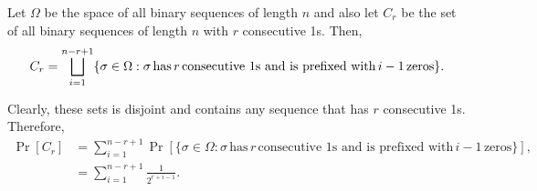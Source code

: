 \begin{solution}
    Let $\Omega$ be the space of all binary sequences of length $n$ and also let $C_r$ be the set of all binary sequences of length $n$ with $r$ consecutive 1s. Then,  
    \[
        C_r = \bigsqcup_{i=1}^{n-r+1} \{\sigma \in \Omega: \sigma\,\text{has}\, r \,\text{consecutive 1s and is prefixed with}\, i-1\,\text{zeros}\}. \\
    \]


    Clearly, these sets is disjoint and contains any sequence that has $r$ consecutive 1s. Therefore, 
    \begin{align*}
        \Pr[C_r] &= \sum_{i=1}^{n-r+1} \Pr[\{\sigma \in \Omega: \sigma\,\text{has}\, r \,\text{consecutive 1s and is prefixed with}\, i-1\,\text{zeros}\}], \\
        &= \sum_{i=1}^{n-r+1} \frac{1}{2^{r + i-1}}.
    \end{align*}
\end{solution}

